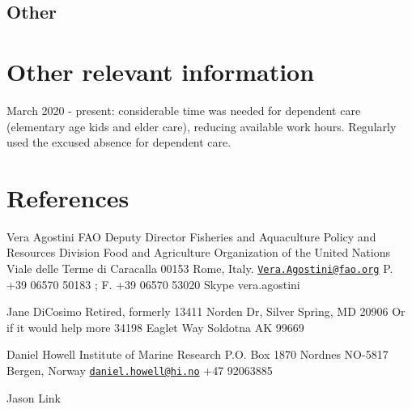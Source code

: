 \documentclass[11pt, a4paper]{awesome-cv}
\begin{document}
\hypertarget{other}{%
\subsection{Other}\label{other}}

\hypertarget{other-relevant-information}{%
\section{Other relevant information}\label{other-relevant-information}}

March 2020 - present: considerable time was needed for dependent care
(elementary age kids and elder care), reducing available work hours.
Regularly used the excused absence for dependent care.

\hypertarget{references}{%
\section{References}\label{references}}

Vera Agostini FAO Deputy Director Fisheries and Aquaculture Policy and
Resources Division Food and Agriculture Organization of the United
Nations Viale delle Terme di Caracalla 00153 Rome, Italy.
\href{mailto:Vera.Agostini@fao.org}{\nolinkurl{Vera.Agostini@fao.org}}
P. +39 06570 50183 ; F. +39 06570 53020 Skype vera.agostini

Jane DiCosimo Retired, formerly 13411 Norden Dr, Silver Spring, MD 20906
Or if it would help more 34198 Eaglet Way Soldotna AK 99669

Daniel Howell Institute of Marine Research P.O. Box 1870 Nordnes NO-5817
Bergen, Norway
\href{mailto:daniel.howell@hi.no}{\nolinkurl{daniel.howell@hi.no}} +47
92063885

Jason Link
\end{document}
